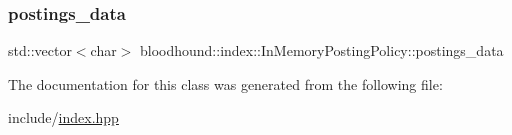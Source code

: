 \subsubsection{\texorpdfstring{postings\+\_\+data}{postings\_data}}
{\footnotesize\ttfamily std\+::vector$<$char$>$ bloodhound\+::index\+::\+In\+Memory\+Posting\+Policy\+::postings\+\_\+data\hspace{0.3cm}{\ttfamily [protected]}}



The documentation for this class was generated from the following file\+:\begin{DoxyCompactItemize}
\item 
include/\mbox{\hyperlink{index_8hpp}{index.\+hpp}}\end{DoxyCompactItemize}
